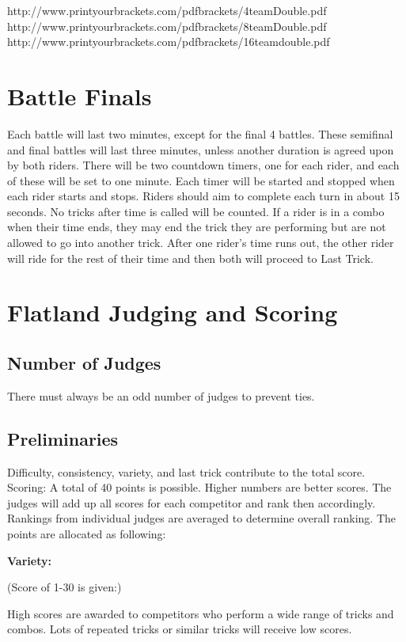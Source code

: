 http://www.printyourbrackets.com/pdfbrackets/4teamDouble.pdf \\
http://www.printyourbrackets.com/pdfbrackets/8teamDouble.pdf \\
http://www.printyourbrackets.com/pdfbrackets/16teamdouble.pdf

\section{Battle Finals}
Each battle will last two minutes, except for the final 4 battles.
These semifinal and final battles will last three minutes, unless another duration is agreed upon by both riders.
There will be two countdown timers, one for each rider, and each of these will be set to one minute.
Each timer will be started and stopped when each rider starts and stops.
Riders should aim to complete each turn in about 15 seconds.
No tricks after time is called will be counted.
If a rider is in a combo when their time ends, they may end the trick they are performing but are not allowed to go into another trick.
After one rider's time runs out, the other rider will ride for the rest of their time and then both will proceed to Last Trick.

\section{Flatland Judging and Scoring \label{sec:flat-street_flatland-judging-scoring}}

\subsection{Number of Judges}
There must always be an odd number of judges to prevent ties. 

\subsection{Preliminaries}
Difficulty, consistency, variety, and last trick contribute to the total score.
Scoring: A total of 40 points is possible.
Higher numbers are better scores.
The judges will add up all scores for each competitor and rank then accordingly.
Rankings from individual judges are averaged to determine overall ranking.
The points are allocated as following: 

\textbf{Variety:}

(Score of 1-30 is given:)

High scores are awarded to competitors who perform a wide range of tricks and combos.
Lots of repeated tricks or similar tricks will receive low scores.

